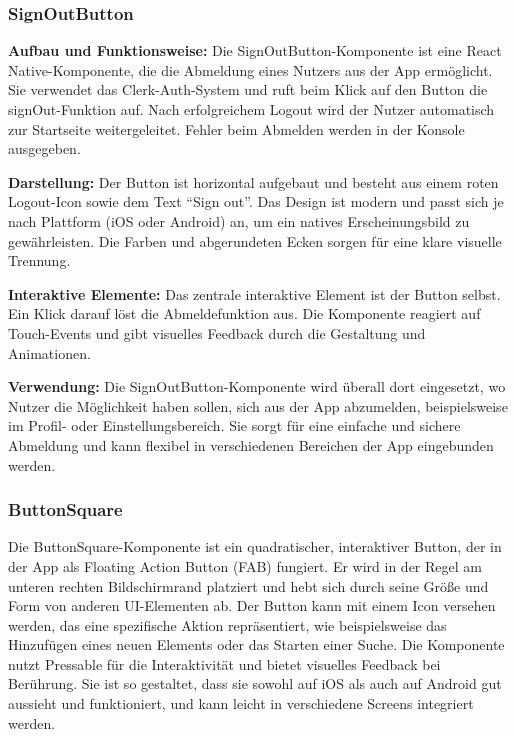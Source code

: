 \subsubsection{SignOutButton}

\noindent\textbf{Aufbau und Funktionsweise:}
Die SignOutButton-Komponente ist eine React Native-Komponente, die die Abmeldung eines Nutzers aus der App ermöglicht. Sie verwendet das Clerk-Auth-System und ruft beim Klick auf den Button die signOut-Funktion auf. Nach erfolgreichem Logout wird der Nutzer automatisch zur Startseite weitergeleitet. Fehler beim Abmelden werden in der Konsole ausgegeben.

\noindent\textbf{Darstellung:}
Der Button ist horizontal aufgebaut und besteht aus einem roten Logout-Icon sowie dem Text \enquote{Sign out}. Das Design ist modern und passt sich je nach Plattform (iOS oder Android) an, um ein natives Erscheinungsbild zu gewährleisten. Die Farben und abgerundeten Ecken sorgen für eine klare visuelle Trennung.

\noindent\textbf{Interaktive Elemente:}
Das zentrale interaktive Element ist der Button selbst. Ein Klick darauf löst die Abmeldefunktion aus. Die Komponente reagiert auf Touch-Events und gibt visuelles Feedback durch die Gestaltung und Animationen.

\noindent\textbf{Verwendung:}
Die SignOutButton-Komponente wird überall dort eingesetzt, wo Nutzer die Möglichkeit haben sollen, sich aus der App abzumelden, beispielsweise im Profil- oder Einstellungsbereich. Sie sorgt für eine einfache und sichere Abmeldung und kann flexibel in verschiedenen Bereichen der App eingebunden werden.

\subsubsection{ButtonSquare}
Die ButtonSquare-Komponente ist ein quadratischer, interaktiver Button, der in der App als Floating Action Button (FAB) fungiert. Er wird in der Regel am unteren rechten Bildschirmrand platziert und hebt sich durch seine Größe und Form von anderen UI-Elementen ab. Der Button kann mit einem Icon versehen werden, das eine spezifische Aktion repräsentiert, wie beispielsweise das Hinzufügen eines neuen Elements oder das Starten einer Suche. Die Komponente nutzt Pressable für die Interaktivität und bietet visuelles Feedback bei Berührung. Sie ist so gestaltet, dass sie sowohl auf iOS als auch auf Android gut aussieht und funktioniert, und kann leicht in verschiedene Screens integriert werden.

